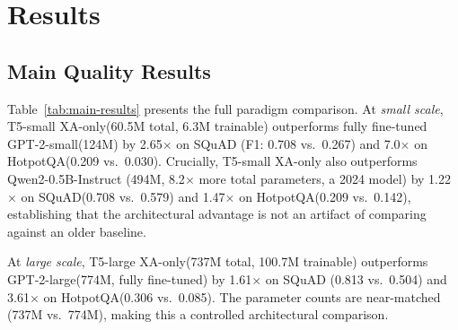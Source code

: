 \documentclass[11pt]{article}
\newcommand{\tssmall}{T5-small\xspace}
\newcommand{\gptsmall}{GPT-2-small\xspace}
\newcommand{\gptlarge}{GPT-2-large\xspace}
\newcommand{\qwensmall}{Qwen2-0.5B\xspace}
\newcommand{\xaonly}{XA-only\xspace}
\newcommand{\squad}{SQuAD\xspace}
\newcommand{\hotpotqa}{HotpotQA\xspace}
\begin{document}
\section{Results}

\subsection{Main Quality Results}
\label{sec:main-results}

Table~\ref{tab:main-results} presents the full paradigm comparison.
At \emph{small scale}, T5-small \xaonly (60.5M total, 6.3M trainable)
outperforms fully fine-tuned \gptsmall (124M) by 2.65$\times$ on \squad
(F1: 0.708 vs.\ 0.267) and 7.0$\times$ on \hotpotqa (0.209 vs.\ 0.030).
Crucially, \tssmall \xaonly also outperforms \qwensmall-Instruct (494M, 8.2$\times$
more total parameters, a 2024 model) by 1.22$\times$ on \squad (0.708 vs.\ 0.579)
and 1.47$\times$ on \hotpotqa (0.209 vs.\ 0.142), establishing that the
architectural advantage is not an artifact of comparing against an older baseline.

At \emph{large scale}, T5-large \xaonly (737M total, 100.7M trainable)
outperforms \gptlarge (774M, fully fine-tuned) by 1.61$\times$ on \squad
(0.813 vs.\ 0.504) and 3.61$\times$ on \hotpotqa (0.306 vs.\ 0.085).
The parameter counts are near-matched (737M vs.\ 774M), making this a
controlled architectural comparison.
\end{document}

